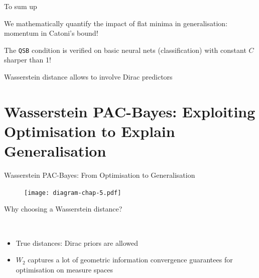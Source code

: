 \documentclass{presentation}
\begin{document}
\begin{xframe}{To sum up}
    \vspace{1cm}
    \Large
    \begin{xitemize}
        \item We mathematically quantify the impact of flat minima in generalisation: momentum in Catoni's bound!
        \item The \texttt{QSB} condition is verified on basic neural nets (classification) with constant $C$ sharper than 1! 
        \item Wasserstein distance allows to involve Dirac predictors
    \end{xitemize}
    \vspace{0.5cm}
    
\end{xframe}

\section{Wasserstein PAC-Bayes: Exploiting Optimisation to Explain Generalisation}

\begin{xframe}{Wasserstein PAC-Bayes: From Optimisation to Generalisation}
    \begin{figure}
        \centering
        \texttt{[image: diagram-chap-5.pdf]}
    \end{figure}
  \end{xframe}

  \begin{xframe}{Why choosing a Wasserstein distance?}
   \vspace{0.5cm}
   {\Large\bf {}\\
   \vspace{0.5cm}
   \begin{itemize}
    \item True distances: Dirac priors are allowed
    \item $W_2$ captures a lot of geometric information \eg convergence guarantees for optimisation on measure spaces
   \end{itemize}
   }
   \vspace{0.5cm}
  \end{xframe}
\end{document}
